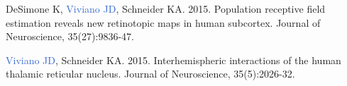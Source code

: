 \documentclass[a4paper,11pt,oneside]{book}
\newcommand\paper[1]{
    #1\\
    \vspace{4.5mm}
}
\begin{document}
\begin{flushleft}

\paper{DeSimone K, \textcolor{highlight}{Viviano JD}, Schneider KA. 2015. Population receptive field estimation reveals new retinotopic maps in human subcortex. Journal of Neuroscience, 35(27):9836-47.}

\paper{\textcolor{highlight}{Viviano JD}, Schneider KA. 2015. Interhemispheric interactions of the human thalamic reticular nucleus. Journal of Neuroscience, 35(5):2026-32.}








\end{flushleft}
\end{document}
